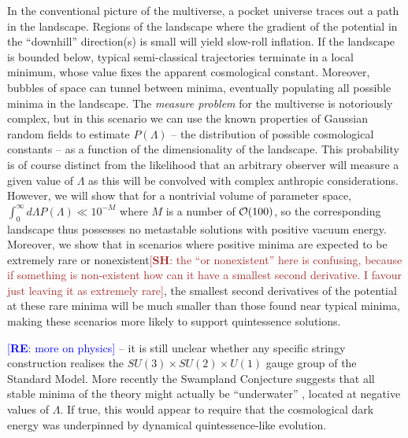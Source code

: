 \documentclass[12pt]{article}
\newcommand{\re}[1]{\textcolor{blue}{[{\bf RE}: #1]}}
\newcommand{\SH}[1]{\textcolor{brown}{[{\bf SH}: #1]}}
\begin{document}
In the conventional picture of the multiverse, a pocket universe traces out a path in the landscape. Regions of the landscape where the gradient of the potential in the ``downhill'' direction(s) is small will yield slow-roll inflation. If the landscape is bounded below, typical semi-classical trajectories terminate in a local minimum, whose value fixes the apparent cosmological constant. Moreover, bubbles of space can tunnel between minima, eventually populating all possible minima in the landscape.  The {\em measure problem\/} for the multiverse is notoriously complex, but in this scenario we can use the known properties of Gaussian random fields to estimate $P(\Lambda)$ -- the distribution of possible cosmological constants -- as a function of the dimensionality of the landscape.  This probability is of course distinct from the likelihood that an arbitrary observer will measure a given value of $\Lambda$ as this will be convolved with complex anthropic considerations. However, we will show that for a nontrivial volume of parameter space,  $\int_0^\infty d\Lambda P(\Lambda) \ll 10^{-M}$  where $M$ is a number of ${\cal{O}}(100)$, so the corresponding landscape thus possesses no metastable solutions with  positive vacuum energy. Moreover, we show that in scenarios where positive minima are expected to be extremely rare or nonexistent\SH{the ``or nonexistent'' here is confusing, because if something is non-existent how can it have a smallest second derivative. I favour just leaving it as extremely rare}, the smallest second derivatives of the potential at these rare minima will be much smaller than those found near typical minima, making these scenarios more likely to support quintessence solutions. 


\re{more on physics} 
 -- it is still unclear whether any specific stringy construction  realises  the $SU(3) \times SU(2) \times U(1)$ gauge group of the Standard Model.  More recently the Swampland Conjecture suggests that all stable minima of the theory might actually be ``underwater'' \cite{Agrawal2018},  located at negative values of $\Lambda$. If true, this would appear to require that the cosmological dark energy was underpinned by dynamical quintessence-like evolution.  
\end{document}
